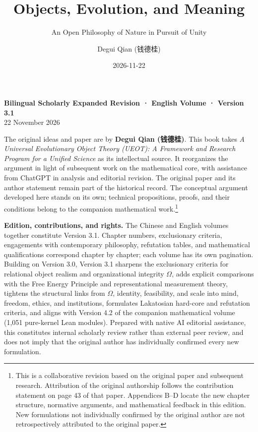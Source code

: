 \documentclass[
  english,
  11pt,
  oneside]{book}
\title{Objects, Evolution, and Meaning}
\subtitle{An Open Philosophy of Nature in Pursuit of Unity}
\author{Degui Qian (钱德桂)}
\date{2026-11-22}
\let\UEOTOriginalTOC\tableofcontents
\renewcommand\tableofcontents{\begingroup
  \hyphenpenalty=10000\exhyphenpenalty=10000
  \UEOTOriginalTOC\endgroup}
\begin{document}
\frontmatter
\maketitle

{
\hypersetup{linkcolor=MidnightBlue}
\setcounter{tocdepth}{1}
\tableofcontents
}
\mainmatter
\begingroup\small\setlength{\parskip}{0.25em}

\textbf{Bilingual Scholarly Expanded Revision · English Volume · Version 3.1}\\
22 November 2026

The original ideas and paper are by \textbf{Degui Qian (钱德桂)}. This book takes \emph{A Universal Evolutionary Object Theory (UEOT): A Framework and Research Program for a Unified Science} as its intellectual source. It reorganizes the argument in light of subsequent work on the mathematical core, with assistance from ChatGPT in analysis and editorial revision. The original paper and its author statement remain part of the historical record. The conceptual argument developed here stands on its own; technical propositions, proofs, and their conditions belong to the companion mathematical work.\footnote{\hypertarget{ph-note-1}{}This is a collaborative revision based on the original paper and subsequent research. Attribution of the original authorship follows the contribution statement on page 43 of that paper. Appendices B--D locate the new chapter structure, normative arguments, and mathematical feedback in this edition. New formulations not individually confirmed by the original author are not retrospectively attributed to the original paper.}

\textbf{Edition, contributions, and rights.} The Chinese and English volumes together constitute Version 3.1. Chapter numbers, exclusionary criteria, engagements with contemporary philosophy, refutation tables, and mathematical qualifications correspond chapter by chapter; each volume has its own pagination. Building on Version 3.0, Version 3.1 sharpens the exclusionary criteria for relational object realism and organizational integrity \(\Omega\), adds explicit comparisons with the Free Energy Principle and representational measurement theory, tightens the structural links from \(\Omega\), identity, feasibility, and scale into mind, freedom, ethics, and institutions, formulates Lakatosian hard-core and refutation criteria, and aligns with Version 4.2 of the companion mathematical volume (1,051 pure-kernel Lean modules). Prepared with native AI editorial assistance, this constitutes internal scholarly review rather than external peer review, and does not imply that the original author has individually confirmed every new formulation.
\end{document}
